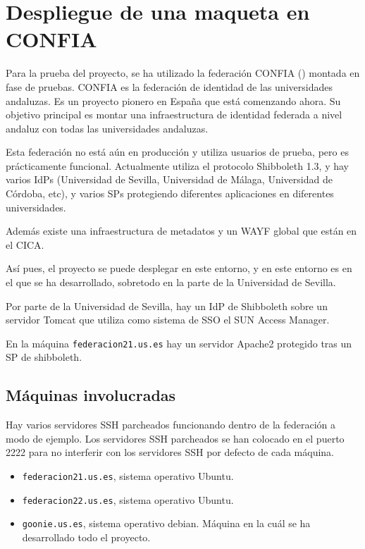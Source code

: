 \chapter{Despliegue de una maqueta en CONFIA}

    Para la prueba del proyecto, se ha utilizado la federación CONFIA
    (\cite{confia}) montada en fase de pruebas. CONFIA es la
    federación de identidad de las universidades andaluzas. Es un
    proyecto pionero en España que está comenzando ahora. Su objetivo
    principal es montar una infraestructura de identidad federada a
    nivel andaluz con todas las universidades andaluzas.

    Esta federación no está aún en producción y utiliza usuarios de
    prueba, pero es prácticamente funcional. Actualmente utiliza el
    protocolo Shibboleth 1.3, y hay varios IdPs (Universidad de Sevilla,
    Universidad de Málaga, Universidad de Córdoba, etc), y varios SPs
    protegiendo diferentes aplicaciones en diferentes universidades.

    Además existe una infraestructura de metadatos y un WAYF global
    que están en el CICA.

    Así pues, el proyecto se puede desplegar en este entorno, y en este
    entorno es en el que se ha desarrollado, sobretodo en la parte de la
    Universidad de Sevilla.

    Por parte de la Universidad de Sevilla, hay un IdP de Shibboleth
    sobre un servidor Tomcat que utiliza como sistema de SSO el SUN
    Access Manager.


    En la máquina \texttt{federacion21.us.es} hay un servidor Apache2
    protegido tras un SP de shibboleth.

\section{Máquinas involucradas}

    Hay varios servidores SSH parcheados funcionando dentro de la
    federación a modo de ejemplo. Los servidores SSH parcheados se han
    colocado en el puerto 2222 para no interferir con los servidores SSH
    por defecto de cada máquina.

    \begin{itemize}

    \item \texttt{federacion21.us.es}, sistema operativo Ubuntu.
    \item \texttt{federacion22.us.es}, sistema operativo Ubuntu.
    \item \texttt{goonie.us.es}, sistema operativo debian. Máquina en la
    cuál se ha desarrollado todo el proyecto.

    \end{itemize}

